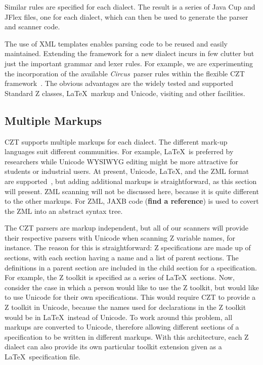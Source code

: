 \documentclass{llncs}
\newcommand{\Circus}{{\sf\slshape Circus}}
\begin{document}
Similar rules are specified for each dialect. The result is a series
of Java Cup and JFlex files, one for each dialect, which can then be
used to generate the parser and scanner code.

The use of XML templates enables parsing code to be reused and easily maintained.
Extending the framework for a new dialect incurs in few clutter but just the important
grammar and lexer rules.
For example, we are experimenting the incorporation of the available \Circus\ parser
rules within the flexible CZT framework~\cite{circus.other:parser}. The obvious advantages
are the widely tested and supported Standard Z classes, \LaTeX\ markup and Unicode,
visiting and other facilities.

\subsection{Multiple Markups}\label{multiple-markups}

 CZT supports multiple markups for each dialect.  The different
 mark-up languages suit different communities.  For example, \LaTeX\
 is preferred by researchers while Unicode WYSIWYG editing might be
 more attractive for students or industrial users. At present,
 Unicode, \LaTeX, and the ZML format are supported~\cite{UttEA:03},
 but adding additional markups is straightforward, as this section
 will present.  ZML scanning will not be discussed here, because it is
 quite different to the other markups. For ZML, JAXB code ({\bf find a
 reference}) is used to covert the ZML into an abstract syntax tree.

The CZT parsers are markup independent, but all of our scanners will
provide their respective parsers with Unicode when scanning Z variable
names, for instance. The reason for this is straightforward: Z specifications
are made up of sections, with each section having a name and a list of
parent sections. The definitions in a parent section are included in
the child section for a specification. For example, the Z toolkit is
specified as a series of \LaTeX\ sections. Now, consider the case in
which a person would like to use the Z toolkit, but would like to use
Unicode for their own specifications. This would require CZT to
provide a Z toolkit in Unicode, because the names used for
declarations in the Z toolkit would be in \LaTeX~instead of
Unicode. To work around this problem, all markups are converted to
Unicode, therefore allowing different sections of a specification to
be written in different markups.
With this architecture, each Z dialect can also provide its own
particular toolkit extension given as a \LaTeX\ specification file.
\end{document}
